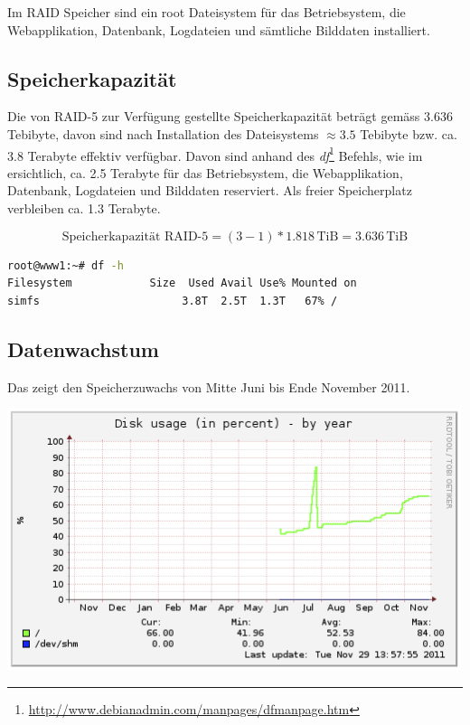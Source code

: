 Im RAID Speicher sind ein root Dateisystem für das Betriebsystem, die Webapplikation, Datenbank, Logdateien und sämtliche Bilddaten installiert.

\subsection{Speicherkapazität}
Die von RAID-5 zur Verfügung gestellte Speicherkapazität beträgt gemäss  3.636 Tebibyte, davon sind nach Installation des Dateisystems $\approx 3.5$ Tebibyte bzw. ca. 3.8 Terabyte effektiv verfügbar. Davon sind anhand des \textit{df}\footnote{\url{http://www.debianadmin.com/manpages/dfmanpage.htm}}
 Befehls, wie im  ersichtlich, ca. 2.5 Terabyte für das Betriebsystem, die Webapplikation, Datenbank, Logdateien und Bilddaten reserviert. Als freier Speicherplatz verbleiben ca. 1.3 Terabyte.

\begin{equation}
\mbox{Speicherkapazität RAID-5}= (3 - 1) * 1.818 \, \mathrm{TiB} = 3.636 \, \mathrm{TiB}
\label{eqn:RAID-5-3disk}
\end{equation}

\begin{lstlisting}[label=df, language=Bash, caption=Report Dateisystem Speicherplatz Belegung in Dezimal Prefix ]
root@www1:~# df -h
Filesystem            Size  Used Avail Use% Mounted on
simfs                      3.8T  2.5T  1.3T   67% /
\end{lstlisting}

\subsection{Datenwachstum}
Das  zeigt den Speicherzuwachs von Mitte Juni bis Ende November 2011.

\begin{center}
\includegraphics[width=\linewidth, keepaspectratio = true]{media/disk-usage-by-year.png}
\end{center}

